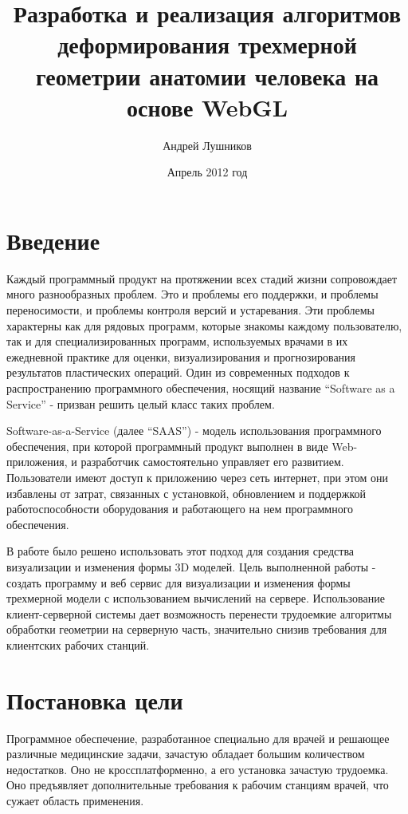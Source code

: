 \documentclass[12pt, a4paper]{article}
\author{Андрей Лушников}
\title{Разработка и реализация алгоритмов деформирования трехмерной геометрии анатомии человека на основе WebGL}
\date{Апрель 2012 год}
\let\stdsection\section
\renewcommand\section{\newpage\stdsection}
\begin{document}
\maketitle

\tableofcontents
\newpage

\section{Введение}
Каждый программный продукт на протяжении всех стадий жизни сопровождает много
разнообразных проблем. Это и проблемы его поддержки, и проблемы переносимости, и
проблемы контроля версий и устаревания. Эти проблемы характерны как для рядовых
программ, которые знакомы каждому пользователю, так и для специализированных
программ, используемых врачами в их ежедневной практике для оценки,
визуализирования и прогнозирования результатов пластических операций. Один из
современных подходов к распространению программного обеспечения, носящий
название ``Software as a Service'' - призван решить целый класс таких проблем.

Software-as-a-Service (далее ``SAAS'') - модель использования программного
обеспечения, при которой программный продукт выполнен в виде Web-приложения, и
разработчик самостоятельно управляет его развитием. Пользователи имеют доступ к
приложению через сеть интернет, при этом они избавлены от затрат, связанных с
установкой, обновлением и поддержкой работоспособности оборудования и
работающего на нем программного обеспечения.

В работе было решено использовать этот подход для создания средства визуализации
и изменения формы 3D моделей.  Цель выполненной работы - создать программу и веб
сервис для визуализации и изменения формы трехмерной модели с использованием
вычислений на сервере. Использование клиент-серверной системы дает возможность
перенести трудоемкие алгоритмы обработки геометрии на серверную часть,
значительно снизив требования для клиентских рабочих станций.

\section{Постановка цели}
Программное обеспечение, разработанное специально для врачей и решающее
различные медицинские задачи, зачастую обладает большим количеством недостатков.
Оно не кроссплатформенно, а его установка зачастую трудоемка. Оно предъявляет
дополнительные требования к рабочим станциям врачей, что сужает область
применения.
\end{document}
